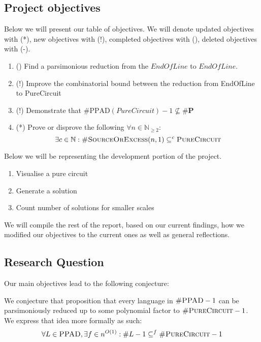 \subsection{Project objectives}

Below we will present our table of objectives. We will denote updated objectives with
(*), new objectives with (!), completed objectives with (\checkmark),  deleted objectives with (-).

\begin{enumerate}[label*=R.\arabic*)]
    \item (\checkmark) Find a parsimonious reduction from the $\textit{EndOfLine}$ to $\textit{EndOfLine}$.
    \item (!) Improve the combinatorial bound between the reduction from EndOfLine to PureCircuit
    \item (!) Demonstrate that $\textbf{\#}\text{PPAD}(PureCircuit)- 1 \not\subseteq \textbf{\#P}$
    \item (*) Prove or disprove the following $\forall n \in \mathbb{N}_{\geq 2}$:
\[
\exists c \in \mathbb{N}:  \textnormal{\textsc{\#SourceOrExcess}}(n, 1) \subseteq^c \textnormal{\textsc{PureCircuit}}
\]

\end{enumerate}

Below we will be representing the development portion of the project.

\begin{enumerate}[label=S.\arabic*)]
    \item Visualise a pure circuit
    \item Generate a solution
    \item Count number of solutions for smaller scales 
\end{enumerate}


We will compile the rest of the report, based on our current findings, how we modified our objectives to
the current ones as well as general reflections.


\subsection{Research Question}

Our main objectives lead to the following conjecture:
\begin{conjecture}
    \label{conj:core-conj}
    We conjecture that proposition that every language in $\textnormal{\textsc{\#PPAD}}-1$
    can be parsimoniously reduced up to some polynomial factor to  $\textnormal{\textsc{\#PureCircuit}} -1$.
    We express that idea more formally as such:
    $$
    \forall L \in \textsc{PPAD}, \exists f \in n^{O(1)}: 
    \#L -1 \subseteq^f \textnormal{\textsc{\#PureCircuit}} -1
    $$
\end{conjecture}

